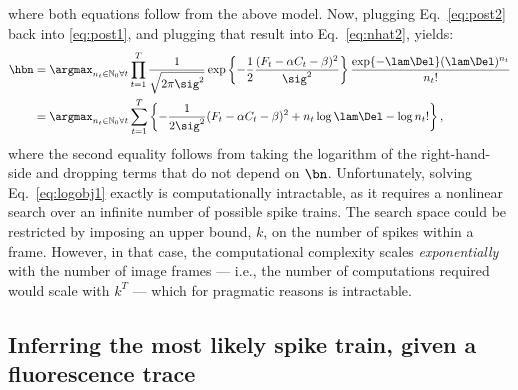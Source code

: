 where both equations follow from the above model.  Now, plugging Eq.~\eqref{eq:post2} back into \eqref{eq:post1}, and plugging that result into Eq.~\eqref{eq:nhat2}, yields:
\begin{subequations}  \label{eq:obj}
\begin{align}
\hbn 	&= \anx \prod_{t=1}^T \frac{1}{\sqrt{2 \pi \sig^2}} \exp \left\{-\frac{1}{2}\frac{(F_t - \alpha C_t - \beta)^2}{\sig^2}\right\} \frac{\exp\{-\lam\Del\} (\lam\Del)^{n_t}}{n_t!}
\label{eq:obj1}\\ &= \anx  \sum_{t=1}^T \left\{ -\frac{1}{2 \sig^2}(F_t - \alpha C_t - \beta)^2  +  n_t \log \lam \Del - \log n_t! \right\}, \label{eq:logobj1}
\end{align} 
\end{subequations}
\noindent where the second equality follows from taking the logarithm of the right-hand-side and dropping terms that do not depend on $\bn$.  Unfortunately, solving Eq.~\eqref{eq:logobj1} exactly is computationally intractable, as it requires a nonlinear search over an infinite number of  possible spike trains.  The search space could be restricted by imposing an upper bound, $k$, on the number of spikes within a frame.  However, in that case, the computational complexity scales \emph{exponentially} with the number of image frames --- i.e.,  the number of computations required would scale with $k^T$ --- which for pragmatic reasons is intractable.




\subsection{Inferring the most likely spike train, given a fluorescence trace} \label{sec:inf}


